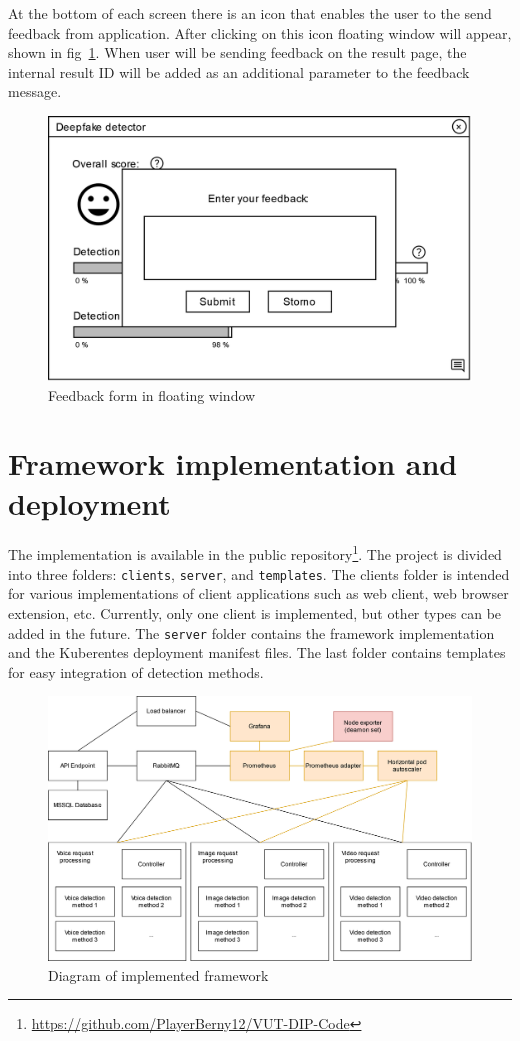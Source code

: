 At the bottom of each screen there is an icon that enables the user to the send feedback from application. After clicking on this icon floating window will appear, shown in fig~\ref{fig:client_wireframe_feedback}. When user will be sending feedback on the result page, the internal result ID will be added as an additional parameter to the feedback message. 

\begin{figure}[H]
    \centering  
    \includegraphics[width=.498\linewidth]{other-fig/client_wireframe_feedback.png}
    \caption{Feedback form in floating window}
    \label{fig:client_wireframe_feedback}
\end{figure}

\chapter{Framework implementation and deployment}
\label{chapter:framework_implementation}

The implementation is available in the public repository\footnote{\url{https://github.com/PlayerBerny12/VUT-DIP-Code}}. The project is divided into three folders: \texttt{clients}, \texttt{server}, and \texttt{templates}. The clients folder is intended for various implementations of client applications such as web client, web browser extension, etc. Currently, only one client is implemented, but other types can be added in the future. The \texttt{server} folder contains the framework implementation and the Kuberentes deployment manifest files. The last folder contains templates for easy integration of detection methods.

\begin{figure}[H]
    \centering
    \includegraphics[width=\linewidth]{other-fig/framework_implementation.png}
    \caption{Diagram of implemented framework}
    \label{fig:framework_implementation}
\end{figure}

